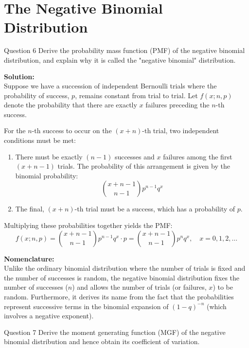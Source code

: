 \documentclass[11pt, a4paper]{article}
\begin{document}
\clearpage
\section{The Negative Binomial Distribution}

\begin{problem}{Question 6}
Derive the probability mass function (PMF) of the negative binomial distribution, and explain why it is called the "negative binomial" distribution.
\end{problem}

\noindent\textbf{Solution:} \\
Suppose we have a succession of independent Bernoulli trials where the probability of success, $p$, remains constant from trial to trial. Let $f(x; n, p)$ denote the probability that there are exactly $x$ failures preceding the $n$-th success.

For the $n$-th success to occur on the $(x+n)$-th trial, two independent conditions must be met:
\begin{enumerate}
    \item There must be exactly $(n-1)$ successes and $x$ failures among the first $(x+n-1)$ trials. The probability of this arrangement is given by the binomial probability:
    \[ \binom{x+n-1}{n-1} p^{n-1} q^x \]
    \item The final, $(x+n)$-th trial must be a success, which has a probability of $p$.
\end{enumerate}
Multiplying these probabilities together yields the PMF:
\begin{equation}
    f(x; n, p) = \binom{x+n-1}{n-1} p^{n-1} q^x \cdot p = \binom{x+n-1}{n-1} p^n q^x, \quad x = 0, 1, 2, \dots
\end{equation}

\noindent\textbf{Nomenclature:} \\
Unlike the ordinary binomial distribution where the number of trials is fixed and the number of successes is random, the negative binomial distribution fixes the number of successes ($n$) and allows the number of trials (or failures, $x$) to be random. Furthermore, it derives its name from the fact that the probabilities represent successive terms in the binomial expansion of $(1-q)^{-n}$ (which involves a negative exponent).

\vspace{0.5cm}
\begin{problem}{Question 7}
Derive the moment generating function (MGF) of the negative binomial distribution and hence obtain its coefficient of variation.
\end{problem}
\end{document}
